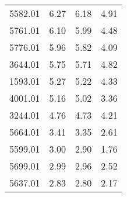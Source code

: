 \begin{table}
\begin{tabular}{rrrr}
5582.01 &             6.27 &             6.18 &             4.91 \\
5761.01 &             6.10 &             5.99 &             4.48 \\
5776.01 &             5.96 &             5.82 &             4.09 \\
3644.01 &             5.75 &             5.71 &             4.82 \\
1593.01 &             5.27 &             5.22 &             4.33 \\
4001.01 &             5.16 &             5.02 &             3.36 \\
3244.01 &             4.76 &             4.73 &             4.21 \\
5664.01 &             3.41 &             3.35 &             2.61 \\
5599.01 &             3.00 &             2.90 &             1.76 \\
5699.01 &             2.99 &             2.96 &             2.52 \\
5637.01 &             2.83 &             2.80 &             2.17 \\
\bottomrule
\end{tabular}
\end{table}
